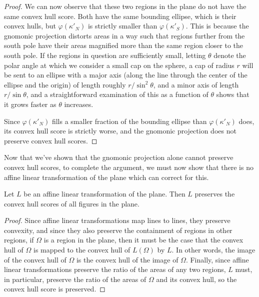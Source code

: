 \begin{proof}
  We can now observe that these two regions in the plane do not have
  the same convex hull score.  Both have the same bounding ellipse,
  which is their convex hulls, but $\varphi(\kappa'_N)$ is strictly
  smaller than $\varphi(\kappa'_S)$.  This is because the gnomonic
  projection distorts areas in a way such that regions further from
  the south pole have their areas magnified more than the same region
  closer to the south pole.  If the regions in question are
  sufficiently small, letting $\theta$ denote the polar angle at which
  we consider a small cap on the sphere, a cap of radius $r$ will be
  sent to an ellipse with a major axis (along the line through the
  center of the ellipse and the origin) of length roughly
  $r/\sin^2{\theta}$, and a minor axis of length
  $r/\sin{\theta}$, and a straightforward examination of this as
  a function of $\theta$ shows that it grows faster as $\theta$
  increases.

  Since $\varphi(\kappa'_N)$ fills a smaller fraction of the bounding
  ellipse than $\varphi(\kappa'_N)$ does, its convex hull score is
  strictly worse, and the gnomonic projection does not preserve convex
  hull scores.
\end{proof}

Now that we've shown that the gnomonic projection alone cannot
preserve convex hull scores, to complete the argument, we must now
show that there is no affine linear transformation of the plane which
can correct for this.

\begin{lemma}\label{lem:noafflin}
  Let $L$ be an affine linear transformation of the plane.  Then $L$
  preserves the convex hull scores of all figures in the plane.
\end{lemma}
\begin{proof}
  Since affine linear transformations map lines to lines, they preserve
  convexity, and since they also preserve the containment of regions in
  other regions, if $\Omega$ is a region in the plane, then it must be
  the case that the convex hull of $\Omega$ is mapped to the convex hull
  of $L(\Omega)$ by $L$.  In other words, the image of the convex hull
  of $\Omega$ is the convex hull of the image of $\Omega$.  Finally,
  since affine linear transformations preserve the ratio of the areas of
  any two regions, $L$ must, in particular, preserve the ratio of the
  areas of $\Omega$ and its convex hull, so the convex hull score is
  preserved.
\end{proof}
